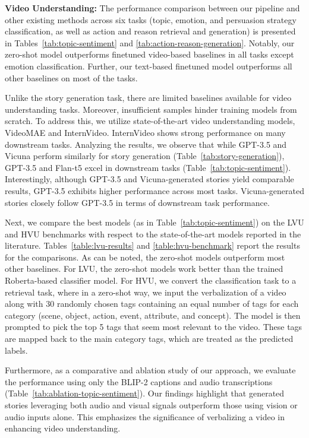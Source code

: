 \documentclass[hidelinks,11pt,a4paper]{report}
\begin{document}
\textbf{Video Understanding:} The performance comparison between our pipeline and other existing methods across six tasks (topic, emotion, and persuasion strategy classification, as well as action and reason retrieval and generation) is presented in Tables~\ref{tab:topic-sentiment} and \ref{tab:action-reason-generation}. Notably, our zero-shot model outperforms finetuned video-based baselines in all tasks except emotion classification. Further, our text-based finetuned model outperforms all other baselines on most of the tasks.

Unlike the story generation task, there are limited baselines available for video understanding tasks. Moreover, insufficient samples hinder training models from scratch. To address this, we utilize state-of-the-art video understanding models, VideoMAE and InternVideo. InternVideo shows strong performance on many downstream tasks. 
Analyzing the results, we observe that while GPT-3.5 and Vicuna perform similarly for story generation (Table~\ref{tab:story-generation}), GPT-3.5 and Flan-t5 excel in downstream tasks (Table~\ref{tab:topic-sentiment}). Interestingly, although GPT-3.5 and Vicuna-generated stories yield comparable results, GPT-3.5 exhibits higher performance across most tasks. Vicuna-generated stories closely follow GPT-3.5 in terms of downstream task performance.


Next, we compare the best models (as in Table~\ref{tab:topic-sentiment}) on the LVU and HVU benchmarks with respect to the state-of-the-art models reported in the literature. Tables~\ref{table:lvu-results} and \ref{table:hvu-benchmark} report the results for the comparisons. As can be noted, the zero-shot models outperform most other baselines. For LVU, the zero-shot models work better than the trained Roberta-based classifier model. For HVU, we convert the classification task to a retrieval task, where in a zero-shot way, we input the verbalization of a video along with 30 randomly chosen tags containing an equal number of tags for each category (scene, object, action, event, attribute, and concept). The model is then prompted to pick the top 5 tags that seem most relevant to the video. These tags are mapped back to the main category tags, which are treated as the predicted labels. 


Furthermore, as a comparative and ablation study of our approach, we evaluate the performance using only the BLIP-2 captions and audio transcriptions (Table~\ref{tab:ablation-topic-sentiment}). Our findings highlight that generated stories leveraging both audio and visual signals outperform those using vision or audio inputs alone. This emphasizes the significance of verbalizing a video in enhancing video understanding.
\end{document}
